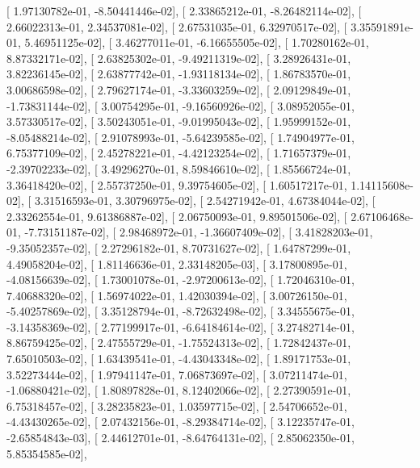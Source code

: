\documentclass{article}
\begin{document}
       [  1.97130782e-01,  -8.50441446e-02],
       [  2.33865212e-01,  -8.26482114e-02],
       [  2.66022313e-01,   2.34537081e-02],
       [  2.67531035e-01,   6.32970517e-02],
       [  3.35591891e-01,   5.46951125e-02],
       [  3.46277011e-01,  -6.16655505e-02],
       [  1.70280162e-01,   8.87332171e-02],
       [  2.63825302e-01,  -9.49211319e-02],
       [  3.28926431e-01,   3.82236145e-02],
       [  2.63877742e-01,  -1.93118134e-02],
       [  1.86783570e-01,   3.00686598e-02],
       [  2.79627174e-01,  -3.33603259e-02],
       [  2.09129849e-01,  -1.73831144e-02],
       [  3.00754295e-01,  -9.16560926e-02],
       [  3.08952055e-01,   3.57330517e-02],
       [  3.50243051e-01,  -9.01995043e-02],
       [  1.95999152e-01,  -8.05488214e-02],
       [  2.91078993e-01,  -5.64239585e-02],
       [  1.74904977e-01,   6.75377109e-02],
       [  2.45278221e-01,  -4.42123254e-02],
       [  1.71657379e-01,  -2.39702233e-02],
       [  3.49296270e-01,   8.59846610e-02],
       [  1.85566724e-01,   3.36418420e-02],
       [  2.55737250e-01,   9.39754605e-02],
       [  1.60517217e-01,   1.14115608e-02],
       [  3.31516593e-01,   3.30796975e-02],
       [  2.54271942e-01,   4.67384044e-02],
       [  2.33262554e-01,   9.61386887e-02],
       [  2.06750093e-01,   9.89501506e-02],
       [  2.67106468e-01,  -7.73151187e-02],
       [  2.98468972e-01,  -1.36607409e-02],
       [  3.41828203e-01,  -9.35052357e-02],
       [  2.27296182e-01,   8.70731627e-02],
       [  1.64787299e-01,   4.49058204e-02],
       [  1.81146636e-01,   2.33148205e-03],
       [  3.17800895e-01,  -4.08156639e-02],
       [  1.73001078e-01,  -2.97200613e-02],
       [  1.72046310e-01,   7.40688320e-02],
       [  1.56974022e-01,   1.42030394e-02],
       [  3.00726150e-01,  -5.40257869e-02],
       [  3.35128794e-01,  -8.72632498e-02],
       [  3.34555675e-01,  -3.14358369e-02],
       [  2.77199917e-01,  -6.64184614e-02],
       [  3.27482714e-01,   8.86759425e-02],
       [  2.47555729e-01,  -1.75524313e-02],
       [  1.72842437e-01,   7.65010503e-02],
       [  1.63439541e-01,  -4.43043348e-02],
       [  1.89171753e-01,   3.52273444e-02],
       [  1.97941147e-01,   7.06873697e-02],
       [  3.07211474e-01,  -1.06880421e-02],
       [  1.80897828e-01,   8.12402066e-02],
       [  2.27390591e-01,   6.75318457e-02],
       [  3.28235823e-01,   1.03597715e-02],
       [  2.54706652e-01,  -4.43430265e-02],
       [  2.07432156e-01,  -8.29384714e-02],
       [  3.12235747e-01,  -2.65854843e-03],
       [  2.44612701e-01,  -8.64764131e-02],
       [  2.85062350e-01,   5.85354585e-02],
\end{document}
